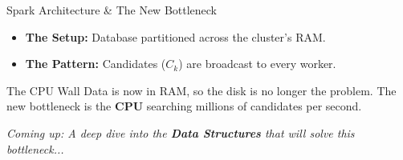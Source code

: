 \begin{frame}{Spark Architecture \& The New Bottleneck}
    \begin{itemize}
        \item \textbf{The Setup:} Database partitioned across the cluster's RAM.
        \item \textbf{The Pattern:} Candidates ($C_k$) are broadcast to every worker.
    \end{itemize}

    \vfill
    \begin{alertblock}{The CPU Wall}
        Data is now in RAM, so the disk is no longer the problem. The new bottleneck is the \textbf{CPU} searching millions of candidates per second.
    \end{alertblock}

    \vfill
    \begin{center}
        \footnotesize \itshape Coming up: A deep dive into the \textbf{Data Structures} that will solve this bottleneck...
    \end{center}
\end{frame}
